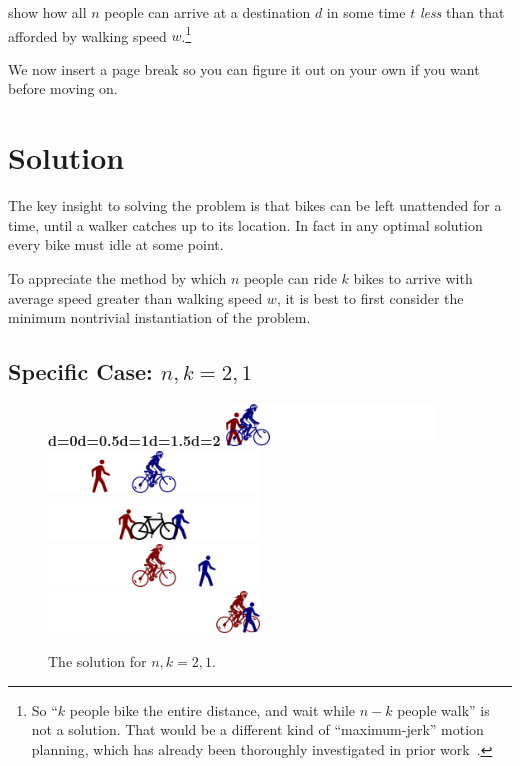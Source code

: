 \documentclass[DIV=calc, paper=a4, fontsize=11pt, twocolumn]{scrartcl}	 %
\newcommand{\initial}[1]{ %
\lettrine[lines=3,lhang=0.3,nindent=0em]{
\color{DarkGoldenrod}
{\textsf{#1}}}{}}
\begin{document}
show how all $n$ people can arrive at a destination $d$ in some time $t$ {\em less} than that afforded by walking speed $w$.\footnote{So ``$k$ people bike the entire distance, and wait while $n-k$ people walk'' is not a solution. That would be a different kind of ``maximum-jerk'' motion planning, which has already been thoroughly investigated in prior work~\cite{jerk}.}

{W}e now insert a page break so you can figure it out on your own if you want before moving on.

\newpage

\section{Solution}

\initial{T}he key insight to solving the problem is that bikes can be left unattended for a time, until a walker catches up to its location. In fact in any optimal solution every bike must idle at some point.

To appreciate the method by which $n$ people can ride $k$ bikes to arrive with average speed greater than walking speed $w$, it is best to first consider the minimum nontrivial instantiation of the problem.

\subsection{Specific Case: $n,k = 2,1$}

\begin{figure}[t]
	\bf d=0\space d=0.5\space d=1\space d=1.5\space d=2
	\includegraphics[width=0.5\textwidth]{x0.png}\\
	\includegraphics[width=0.5\textwidth]{x1.png}\\
	\includegraphics[width=0.5\textwidth]{x2.png}\\
	\includegraphics[width=0.5\textwidth]{x3.png}\\
	\includegraphics[width=0.5\textwidth]{x4.png}\\
	\caption{The solution for $n,k=2,1$.}
	\label{fig:sol}
\end{figure}
\end{document}
